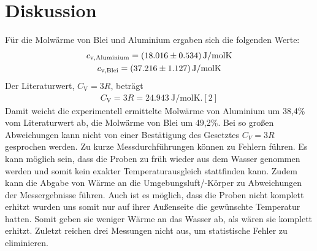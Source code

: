 \section{Diskussion}
Für die Molwärme von Blei und Aluminium ergaben sich die folgenden Werte:
\begin{gather*}
	c_\text{v,Aluminium} = \SI{18,016 \pm 0,534}{\joule\per\text{mol}\kelvin}\\
	c_\text{v,Blei} = \SI{37,216 \pm 1,127}{\joule\per\text{mol}\kelvin}
\end{gather*}
Der Literaturwert, $C_\text{V} = 3R$, beträgt
\begin{gather*}
	C_\text{V} = 3R = \SI{24,943}{\joule\per\text{mol}\kelvin}. [2]
\end{gather*}
Damit weicht die experimentell ermittelte Molwärme von Aluminium um 38,4\% vom Literaturwert ab, die Molwärme von Blei um 49,2\%.
Bei so großen Abweichungen kann nicht von einer Bestätigung des Gesetztes $C_V = 3R$ gesprochen werden.
Zu kurze Messdurchführungen können zu Fehlern führen. Es kann möglich sein, dass die Proben zu früh wieder aus dem Wasser genommen werden und somit kein exakter Temperaturausgleich stattfinden kann. Zudem kann die Abgabe von Wärme an die Umgebungsluft/-Körper zu Abweichungen der Messergebnisse führen. Auch ist es möglich, dass die Proben nicht komplett erhitzt wurden uns somit nur auf ihrer Außenseite die gewünschte Temperatur hatten. Somit geben sie weniger Wärme an das Wasser ab, als wären sie komplett erhitzt. 
Zuletzt reichen drei Messungen nicht aus, um statistische Fehler zu eliminieren.